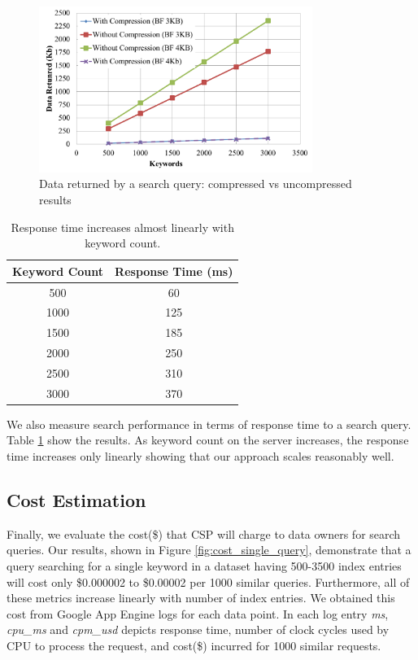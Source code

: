 \begin{figure}[h!]
  \centering
  \includegraphics[width= 3.5in]{figures/comp_compare.png}
  \caption{Data returned by a search query: compressed vs uncompressed results}
  \label{fig:compress}
\end{figure}


\begin{table}[th!]
\centering
\begin{tabular}{| c | c | }
\hline
Keyword Count & Response Time (ms) \\
\hline
500  &  60 \\
1000 &  125 \\
1500 &  185 \\
2000 &  250 \\
2500 &  310 \\
3000 &  370 \\
\hline
\end{tabular}
\caption{Response time increases almost linearly with keyword count.}
\label{tab:search_response_time}

\end{table}

We also measure search performance in terms of response time to a search query. 
Table \ref{tab:search_response_time} show the results. As keyword count on the
server increases, the response time increases only linearly showing that our
approach scales reasonably well.

\subsection{Cost Estimation}

Finally, we evaluate the cost(\$) that CSP will charge to data owners for search
queries. Our results, shown in Figure \ref{fig:cost_single_query}, demonstrate that a query
searching for a single keyword in a dataset having 500-3500 index entries will cost only \$0.000002 to \$0.00002 per 1000 similar
queries. Furthermore, all of these metrics increase linearly with number of index entries.
We obtained this cost from Google App Engine logs for each data point. In
each log entry \emph{ms}, \emph{cpu\_ms} and \emph{cpm\_usd} depicts response
time, number of clock cycles used by CPU to process the request, and cost(\$)
incurred for 1000 similar requests.

